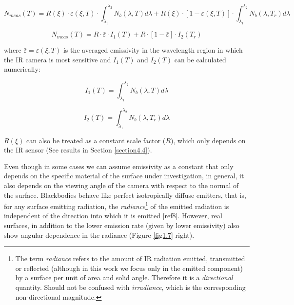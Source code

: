 		\begin{equation}\label{eq1.15}
			N_{meas}(T)= R(\xi) \cdot \varepsilon(\xi,T) \cdot \int_{\lambda_{1}}^{\lambda_{2}} N_{b}(\lambda,T) d\lambda + R(\xi) \cdot [1- \varepsilon(\xi,T)] \cdot \int_{\lambda_{1}}^{\lambda_{2}} N_{b}(\lambda,T_{r}) d\lambda
		\end{equation}	
		
		\begin{equation}\label{eq1.16}
			N_{meas}(T)= R \cdot \bar{\varepsilon} \cdot I_{1}(T) + R \cdot [1- \bar{\varepsilon}] \cdot I_{2}(T_{r})
		\end{equation}\bigskip
		
		where $\bar{\varepsilon}=\varepsilon(\xi,T)$ is the averaged emissivity in the wavelength region in which the IR camera is most sensitive and $I_{1}(T)$ and $I_{2}(T)$ can be calculated numerically:
		
		\begin{equation}\label{eq3.10}
			I_{1}(T)=\int_{\lambda_{1}}^{\lambda_{2}} N_{b}(\lambda,T) d\lambda
		\end{equation}
		
		\begin{equation}\label{eq3.11}
			I_{2}(T)=\int_{\lambda_{1}}^{\lambda_{2}} N_{b}(\lambda,T_{r}) d\lambda
		\end{equation}\bigskip
		
		$R(\xi)$ can also be treated as a constant scale factor ($R$), which only depends on the IR sensor (See results in Section \ref{section4.4}).
		
		Even though in some cases we can assume emissivity as a constant that only depends on the specific material of the surface under investigation, in general, it also depends on the viewing angle of the camera with respect to the normal of the surface. 
		Blackbodies behave like perfect isotropically diffuse emitters, that is, for any surface emitting radiation, the \textit{radiance}\footnote{{\footnotesize The term \textit{radiance} refers to the amount of IR radiation emitted, transmitted or reflected (although in this work we focus only in the emitted component) by a surface per unit of area and solid angle. Therefore it is a \textit{directional} quantity. Should not be confused with \textit{irradiance}, which is the corresponding non-directional magnitude.}} of the emitted radiation is independent of the direction into which it is emitted \ref{ref8}. However, real surfaces, in addition to the lower emission rate (given by lower emissivity) also show angular dependence in the radiance (Figure \ref{fig1.7} right).
		
